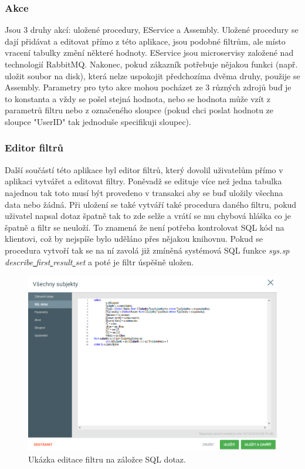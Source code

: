 \documentclass[czech,bachelorpractice,dept460,male,csharp]{diploma}
\newcommand{\un}{\underline{ }}
\begin{document}
		\subsubsection{Akce}
			Jsou 3 druhy akcí: uložené procedury, EService a Assembly. Uložené procedury se dají přidávat a editovat přímo z této aplikace, jsou podobné filtrům, ale místo vracení tabulky změní některé hodnoty. EService jsou microservisy založené nad technologií RabbitMQ. Nakonec, pokud zákazník potřebuje nějakou funkci (např. uložit soubor na disk), která nelze uspokojit předchozíma dvěma druhy, použije se Assembly. Parametry pro tyto akce mohou pocházet ze 3 různých zdrojů buď je to konstanta a vždy se pošel stejná hodnota, nebo se hodnota může vzít z parametrů filtru nebo z označeného sloupce (pokud chci poslat hodnotu ze sloupce "UserID" tak jednoduše specifikuji sloupec). 
		\subsubsection{Editor filtrů}
			Další součástí této aplikace byl editor filtrů, který dovolil uživatelům přímo v aplikaci vytvářet a editovat filtry. Poněvadž se edituje více než jedna tabulka najednou tak toto musí být provedeno v transakci aby se buď uložily všechna data nebo žádná. Při uložení se také vytváří také procedura daného filtru, pokud uživatel napsal dotaz špatně tak to zde selže a vrátí se mu chybová hláška co je špatně a filtr se neuloží. To znamená že není potřeba kontrolovat SQL kód na klientovi, což by nejspíše bylo uděláno přes nějakou knihovnu. Pokud se procedura vytvoří tak se na ní zavolá již zmíněná systémová SQL funkce \textit{sys.sp{\un}describe{\un}first{\un}result{\un}set} a poté je filtr úspěšně uložen.
			\begin{figure}[h]
				\includegraphics[width=1.0\textwidth]{Figures/Edit.png}
				\caption{Ukázka editace filtru na záložce SQL dotaz.}
    			\label{fig:Editimg}
			\end{figure}
\end{document}

